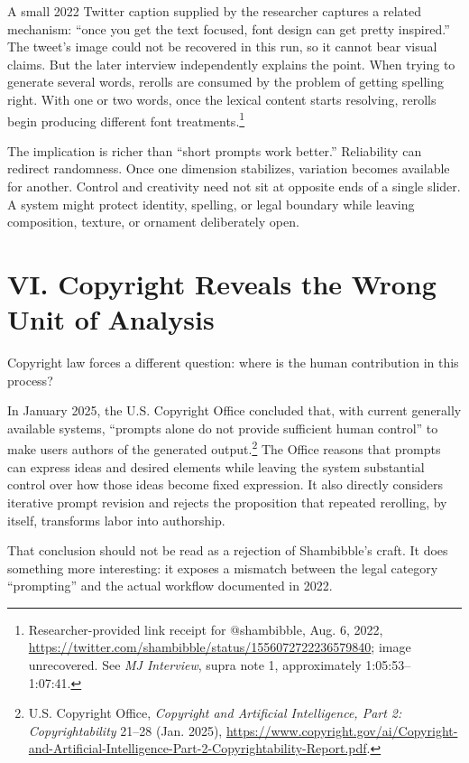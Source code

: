 \documentclass[11pt]{article}
\begin{document}
A small 2022 Twitter caption supplied by the researcher captures a related mechanism: ``once you get the text focused, font design can get pretty inspired.'' The tweet's image could not be recovered in this run, so it cannot bear visual claims. But the later interview independently explains the point. When trying to generate several words, rerolls are consumed by the problem of getting spelling right. With one or two words, once the lexical content starts resolving, rerolls begin producing different font treatments.\footnote{Researcher-provided link receipt for @shambibble, Aug. 6, 2022, \url{https://twitter.com/shambibble/status/1556072722236579840}; image unrecovered. See \emph{MJ Interview}, supra note 1, approximately 1:05:53--1:07:41.}

The implication is richer than ``short prompts work better.'' Reliability can redirect randomness. Once one dimension stabilizes, variation becomes available for another. Control and creativity need not sit at opposite ends of a single slider. A system might protect identity, spelling, or legal boundary while leaving composition, texture, or ornament deliberately open.

\section*{VI. Copyright Reveals the Wrong Unit of Analysis}
Copyright law forces a different question: where is the human contribution in this process?

In January 2025, the U.S. Copyright Office concluded that, with current generally available systems, ``prompts alone do not provide sufficient human control'' to make users authors of the generated output.\footnote{U.S. Copyright Office, \emph{Copyright and Artificial Intelligence, Part 2: Copyrightability} 21--28 (Jan. 2025), \url{https://www.copyright.gov/ai/Copyright-and-Artificial-Intelligence-Part-2-Copyrightability-Report.pdf}.} The Office reasons that prompts can express ideas and desired elements while leaving the system substantial control over how those ideas become fixed expression. It also directly considers iterative prompt revision and rejects the proposition that repeated rerolling, by itself, transforms labor into authorship.

That conclusion should not be read as a rejection of Shambibble's craft. It does something more interesting: it exposes a mismatch between the legal category ``prompting'' and the actual workflow documented in 2022.
\end{document}
